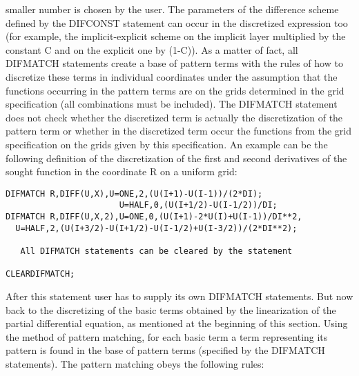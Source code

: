 smaller number is chosen by the user.  The parameters  of the difference
scheme defined  by the  DIFCONST statement  can occur in the discretized
expression  too  (for  example,  the  implicit-explicit  scheme  on  the
implicit layer  multiplied by  the constant C and on the explicit one by
(1-C)).  As a matter of fact, all DIFMATCH statements  create a  base of
pattern  terms  with  the  rules  of  how  to  discretize these terms in
individual coordinates under the assumption that the functions occurring
in  the   pattern  terms  are  on  the  grids  determined  in  the  grid
specification (all combinations must be included).
     The DIFMATCH statement does not check whether the  discretized term
is actually  the discretization  of the  pattern term  or whether in the
discretized term occur the functions from the grid  specification on the
grids  given  by  this  specification.  An  example can be the following
definition of the discretization of the first and  second derivatives of
the sought function in the coordinate R on a uniform grid:
{\small\begin{verbatim}
DIFMATCH R,DIFF(U,X),U=ONE,2,(U(I+1)-U(I-1))/(2*DI);
                       U=HALF,0,(U(I+1/2)-U(I-1/2))/DI;
DIFMATCH R,DIFF(U,X,2),U=ONE,0,(U(I+1)-2*U(I)+U(I-1))/DI**2,
  U=HALF,2,(U(I+3/2)-U(I+1/2)-U(I-1/2)+U(I-3/2))/(2*DI**2);

   All DIFMATCH statements can be cleared by the statement

CLEARDIFMATCH;
\end{verbatim}}
After this statement user has to supply its own DIFMATCH statements.
     But now back to the discretizing of the basic terms obtained by the
linearization of the partial differential equation, as mentioned  at the
beginning of  this section.  Using the  method of  pattern matching, for
each basic term a term representing its pattern is found in the  base of
pattern  terms  (specified  by  the  DIFMATCH  statements).  The pattern
matching obeys the following rules:
